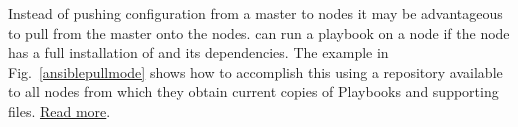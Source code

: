 Instead of pushing configuration from a master to nodes it may be advantageous to pull from the master onto the nodes.
\ansible{} can run a playbook on a node if the node has a full installation of \ansible{} and its dependencies.
The example in Fig.~\ref{ansiblepullmode} shows how to accomplish this using a repository available to all nodes from which they obtain current copies of Playbooks and supporting files. \href{http://jpmens.net/2012/07/14/ansible-pull-instead-of-push/}{Read more}.

